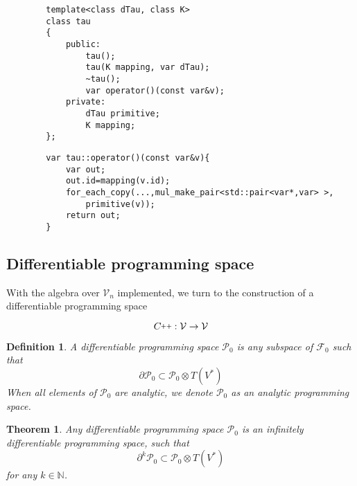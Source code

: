 \documentclass{article}
\newcommand{\VV}{\mathcal{V}}
\newcommand{\F}{\mathcal{F}}
\newcommand{\CC}{C\nolinebreak\hspace{-.05em}\raisebox{.4ex}{\tiny\bf +}\nolinebreak\hspace{-.10em}\raisebox{.4ex}{\tiny\bf +}}
\def\CC{{C\nolinebreak[4]\hspace{-.05em}\raisebox{.4ex}{\tiny\bf ++}}}
\newcommand{\dP}{\mathcal{P}}
\newcommand{\D}{\partial}
\newtheorem{definicija}{Definition}[section]
\newtheorem{izrek}{Theorem}[section]
\begin{document}
        \begin{lstlisting}
        template<class dTau, class K>
        class tau
        {
            public:
                tau();
                tau(K mapping, var dTau);
                ~tau();
                var operator()(const var&v);
            private:
                dTau primitive;
                K mapping;
        };
        \end{lstlisting}
        
        \begin{lstlisting}
        var tau::operator()(const var&v){
            var out;
            out.id=mapping(v.id);
            for_each_copy(...,mul_make_pair<std::pair<var*,var> >, 
            	primitive(v));
            return out;
        }
        \end{lstlisting}
        
          \subsection{Differentiable programming space}
              
              With the algebra over $\VV_n$ implemented, we turn to the construction of a differentiable programming space
              
              \begin{equation}
              \CC:\VV\to\VV
              \end{equation}
              
              \begin{definicija}\label{def:dP}
               	A \emph{differentiable programming space} $\dP_0$ is any subspace of $\F_0$ such that
               	\begin{equation}\label{eq:P}
               	\D\dP_0\subset\dP_0\otimes T(V^*)
               	\end{equation}
               	When all elements of $\dP_0$ are analytic, we denote $\dP_0$ as an \emph{analytic programming space}.
               \end{definicija}
              
              \begin{izrek}\label{izr:P}
              	Any differentiable programming space $\dP_0$ is an
                infinitely differentiable programming space, such that
              	\begin{equation}\label{eq:P_n}
              	 		\D^k\dP_0\subset\dP_0\otimes T(V^*)
              	 	\end{equation}
              for any $k\in\mathbb{N}$.
              \end{izrek}
              
\end{document}

